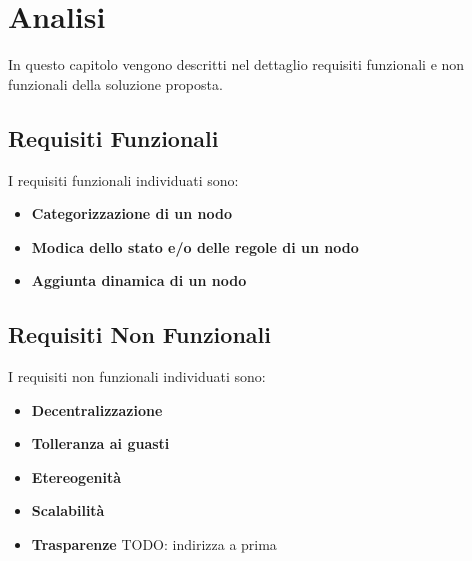 \documentclass{memoir}
\begin{document}

\chapter{Analisi}\label{ch:analisi}

In questo capitolo vengono descritti nel dettaglio requisiti funzionali e non funzionali della soluzione proposta.

\section{Requisiti Funzionali}

I requisiti funzionali individuati sono:
\begin{itemize}
\item \textbf{Categorizzazione di un nodo}
\item \textbf{Modica dello stato e/o delle regole di un nodo}
\item \textbf{Aggiunta dinamica di un nodo}
\end{itemize}

\section{Requisiti Non Funzionali}

I requisiti non funzionali individuati sono:
\begin{itemize}
\item \textbf{Decentralizzazione}
\item \textbf{Tolleranza ai guasti}
\item \textbf{Etereogenità}
\item \textbf{Scalabilità}
\item \textbf{Trasparenze} TODO: indirizza a prima
\end{itemize}
\end{document}
